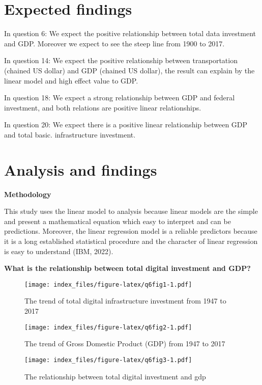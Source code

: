 \documentclass[
]{article}
\begin{document}
\hypertarget{expected-findings}{%
\section{Expected findings}\label{expected-findings}}

In question 6: We expect the positive relationship between total data investment and GDP. Moreover we expect to see the steep line from 1900 to 2017.

In question 14: We expect the positive relationship between transportation (chained US dollar) and GDP (chained US dollar), the result can explain by the linear model and high effect value to GDP.

In question 18: We expect a strong relationship between GDP and federal investment, and both relations are positive linear relationships.

In question 20: We expect there is a positive linear relationship between GDP and total basic. infrastructure investment.

\hypertarget{analysis-and-findings}{%
\section{Analysis and findings}\label{analysis-and-findings}}

\textbf{Methodology}

This study uses the linear model to analysis because linear models are the simple and present a mathematical equation which easy to interpret and can be predictions. Moreover, the linear regression model is a reliable predictors because it is a long established statistical procedure and the character of linear regression is easy to understand (IBM, 2022).

\textbf{What is the relationship between total digital investment and GDP?}

\begin{figure}
\centering
\texttt{[image: index\_files/figure-latex/q6fig1-1.pdf]}
\caption{\label{fig:q6fig1}The trend of total digital infrastructure investment from 1947 to 2017}
\end{figure}

\begin{figure}
\centering
\texttt{[image: index\_files/figure-latex/q6fig2-1.pdf]}
\caption{\label{fig:q6fig2}The trend of Gross Domestic Product (GDP) from 1947 to 2017}
\end{figure}

\begin{figure}
\centering
\texttt{[image: index\_files/figure-latex/q6fig3-1.pdf]}
\caption{\label{fig:q6fig3}The relationship between total digital investment and gdp}
\end{figure}
\end{document}
